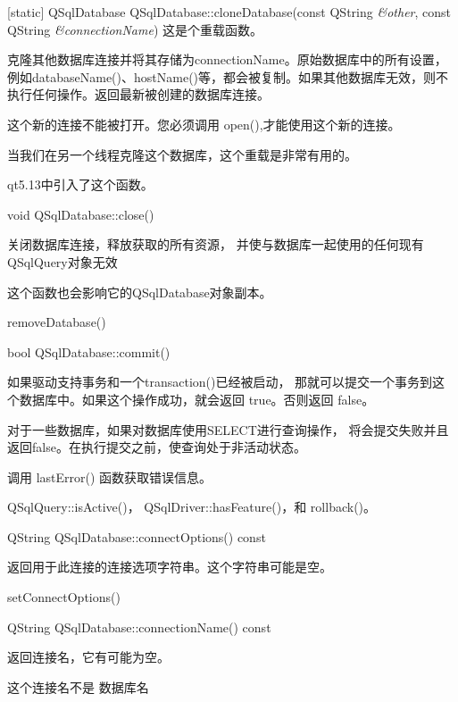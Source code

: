 [static] QSqlDatabase QSqlDatabase::cloneDatabase(const QString \emph{\&other}, const QString \emph{\&connectionName})
这是个重载函数。

克隆其他数据库连接并将其存储为connectionName。原始数据库中的所有设置，例如databaseName()、hostName()等，都会被复制。如果其他数据库无效，则不执行任何操作。返回最新被创建的数据库连接。



\begin{notice}
这个新的连接不能被打开。您必须调用 open(),才能使用这个新的连接。
\end{notice}

当我们在另一个线程克隆这个数据库，这个重载是非常有用的。

qt5.13中引入了这个函数。

void QSqlDatabase::close()

关闭数据库连接，释放获取的所有资源，
并使与数据库一起使用的任何现有QSqlQuery对象无效

这个函数也会影响它的QSqlDatabase对象副本。

\begin{seeAlso}
removeDatabase()
\end{seeAlso}


bool QSqlDatabase::commit()

如果驱动支持事务和一个transaction()已经被启动，
那就可以提交一个事务到这个数据库中。如果这个操作成功，就会返回 true。否则返回 false。

\begin{notice}
对于一些数据库，如果对数据库使用SELECT进行查询操作，
将会提交失败并且返回false。在执行提交之前，使查询处于非活动状态。
\end{notice} 

调用 lastError() 函数获取错误信息。

\begin{seeAlso}
 QSqlQuery::isActive()， QSqlDriver::hasFeature()，和 rollback()。
\end{seeAlso}


QString QSqlDatabase::connectOptions() const

返回用于此连接的连接选项字符串。这个字符串可能是空。


\begin{seeAlso}
setConnectOptions()
\end{seeAlso}

QString QSqlDatabase::connectionName() const

返回连接名，它有可能为空。


\begin{notice}
这个连接名不是 数据库名
\end{notice}

